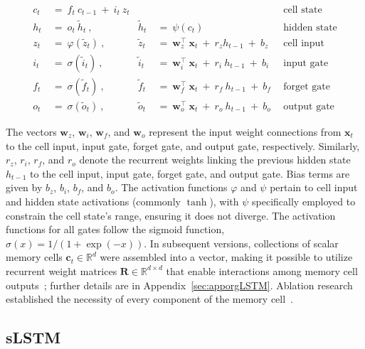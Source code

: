 \begin{align}
c_t \ &= \  f_t \ c_{t-1} \ + \ i_t \ z_t &  & &\text{cell state} \\
h_t  \ &= \ o_t \ \tilde{h}_t \ , & \tilde{h}_t \ &= \ \psi \left( c_t\right)
  &\text{hidden state} \\
z_t \ &= \ \varphi \left( \tilde{z}_t \right) \ , 
  &\tilde{z}_t \ &=  \ \mathbf{w}^\top_{z} \ \mathbf{x}_t \ + \
  r_{z}  h_{t-1} \ + \  b_{z} \ \
  &\text{cell input} \\
i_t \ &= \ \sigma \left( \tilde{i}_t  \right) \ , 
  &\tilde{i}_t \ &= \ \mathbf{w}^\top_{i} \ \mathbf{x}_t \ + \
  r_{i}  \ h_{t-1} \ + \  b_{i} \ \
  &\text{input gate} \\
f_t \ &= \ \sigma \left(  \tilde{f}_t \right) \ , 
  &\tilde{f}_t \ &= \ \mathbf{w}^\top_{f} \ \mathbf{x}_t  \ + \
  r_{f}  \ h_{t-1} \ + \  b_{f} \ \
  &\text{forget gate} \\
o_t \ &= \ \sigma \left( \tilde{o}_t \right) \ , 
  &\tilde{o}_t  \ &= \ \mathbf{w}^\top_{o} \ \mathbf{x}_t \ + \
  r_{o}  \ h_{t-1} \ + \  b_{o} \ \
  &\text{output gate} 
\end{align}

The vectors $\mathbf{w}_{z}$, $\mathbf{w}_{i}$, $\mathbf{w}_{f}$, and $\mathbf{w}_{o}$ represent the input weight connections from $\mathbf{x}_t$ to the cell input, input gate, forget gate, and output gate, respectively. Similarly, $r_{z}$, $r_{i}$, $r_{f}$, and $r_{o}$ denote the recurrent weights linking the previous hidden state $h_{t-1}$ to the cell input, input gate, forget gate, and output gate. Bias terms are given by $b_{z}$, $b_{i}$, $b_{f}$, and $b_{o}$. The activation functions $\varphi$ and $\psi$ pertain to cell input and hidden state activations (commonly $\tanh$), with $\psi$ specifically employed to constrain the cell state’s range, ensuring it does not diverge. The activation functions for all gates follow the sigmoid function, $\sigma \left( x \right)= 1/(1+\exp(-x))$. In subsequent versions, collections of scalar memory cells $\mathbf{c}_t \in \mathbb{R}^{d}$ were assembled into a vector, making it possible to utilize recurrent weight matrices $\mathbf{R} \in \mathbb{R}^{d \times d}$ that enable interactions among memory cell outputs~\citep{Greff:15}; further details are in Appendix~\ref{sec:apporgLSTM}. Ablation research established the necessity of every component of the memory cell~\citep{Greff:15}.

\subsection{sLSTM}
\label{sec:sLSTM}


